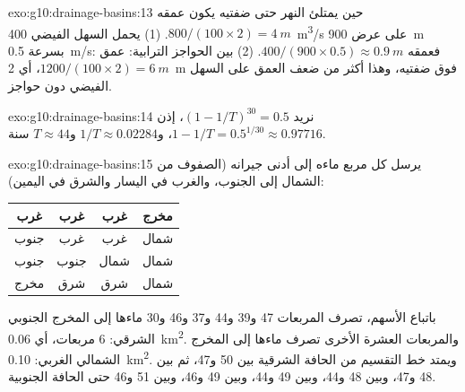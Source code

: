 \begin{solution}{exo:g10:drainage-basins:13}
حين يمتلئ النهر حتى ضفتيه يكون عمقه $800/(100 \times 2) = \qty{4}{m}$.
(1) يحمل السهل الفيضي \qty{400}{m^3/s} على عرض \qty{900}{m} بسرعة
\qty{0.5}{m/s}: فعمقه $400/(900 \times 0.5) \approx \qty{0.9}{m}$.
(2) بين الحواجز الترابية: عمق $1200/(100 \times 2) = \qty{6}{m}$، أي \qty{2}{m}
فوق ضفتيه، وهذا أكثر من ضعف العمق على السهل الفيضي دون
حواجز.
\end{solution}

\begin{solution}{exo:g10:drainage-basins:14}
نريد $(1 - 1/T)^{30} = 0.5$، إذن $1 - 1/T = 0.5^{1/30} \approx 0.97716$،
و$1/T \approx 0.02284$ و$T \approx 44$ سنة.
\end{solution}

\begin{solution}{exo:g10:drainage-basins:15}
يرسل كل مربع ماءه إلى أدنى جيرانه (الصفوف من الشمال إلى الجنوب،
والغرب في اليسار والشرق في اليمين):
\begin{center}
\begin{tabular}{|c|c|c|c|}
\hline
غرب & غرب & غرب & مخرج \\ \hline
جنوب & غرب & غرب & شمال \\ \hline
جنوب & جنوب & شمال & شمال \\ \hline
مخرج & شرق & شرق & شمال \\ \hline
\end{tabular}
\end{center}
باتباع الأسهم، تصرف المربعات 47 و39 و44 و37 و46 و30 ماءها إلى المخرج
الجنوبي الشرقي: 6 مربعات، أي \qty{0.06}{km^2}. والمربعات العشرة الأخرى تصرف ماءها
إلى المخرج الشمالي الغربي: \qty{0.10}{km^2}. ويمتد خط التقسيم من الحافة
الشرقية بين 50 و47، ثم بين 48 و47، وبين 48 و44، وبين
49 و44، وبين 49 و46، وبين 51 و46 حتى الحافة الجنوبية.
\end{solution}

